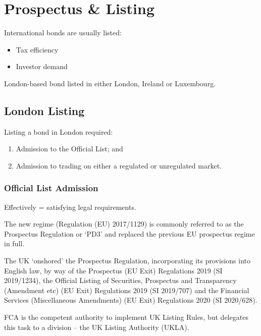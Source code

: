 \documentclass[
]{article}
\providecommand{\tightlist}{%
  \setlength{\itemsep}{0pt}\setlength{\parskip}{0pt}}
\begin{document}
\hypertarget{prospectus-listing}{%
\section{Prospectus \& Listing}\label{prospectus-listing}}

International bonds are usually listed:

\begin{itemize}
\tightlist
\item
  Tax efficiency
\item
  Investor demand
\end{itemize}

London-based bond listed in either London, Ireland or Luxembourg.

\hypertarget{london-listing}{%
\subsection{London Listing}\label{london-listing}}

Listing a bond in London required:

\begin{enumerate}
\def\labelenumi{\arabic{enumi}.}
\tightlist
\item
  Admission to the Official List; and
\item
  Admission to trading on either a regulated or unregulated market.
\end{enumerate}

\hypertarget{official-list-admission}{%
\subsubsection{Official List Admission}\label{official-list-admission}}

Effectively = satisfying legal requirements.

The new regime (Regulation (EU) 2017/1129) is commonly referred to as
the Prospectus Regulation or `PD3' and replaced the previous EU
prospectus regime in full.

The UK `onshored' the Prospectus Regulation, incorporating its
provisions into English law, by way of the Prospectus (EU Exit)
Regulations 2019 (SI 2019/1234), the Official Listing of Securities,
Prospectus and Transparency (Amendment etc) (EU Exit) Regulations 2019
(SI 2019/707) and the Financial Services (Miscellaneous Amendments) (EU
Exit) Regulations 2020 (SI 2020/628).

FCA is the competent authority to implement UK Listing Rules, but
delegates this task to a division -- the UK Listing Authority (UKLA).
\end{document}
